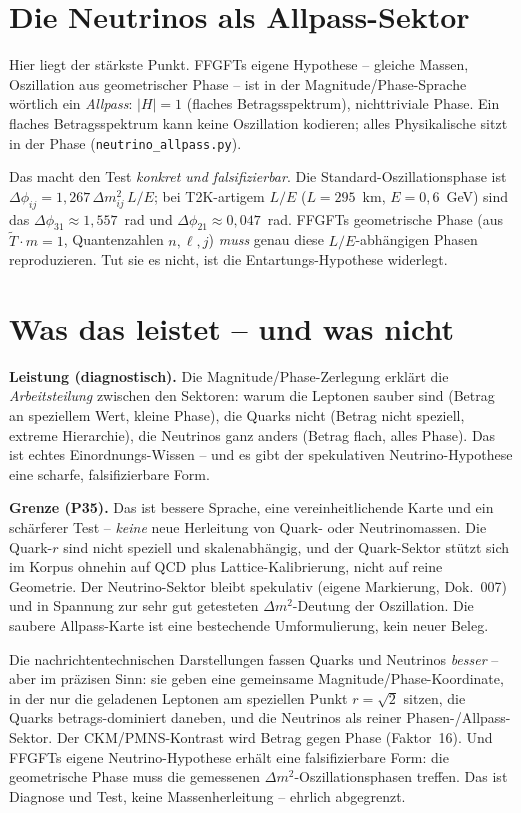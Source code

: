 \section{Die Neutrinos als Allpass-Sektor}
Hier liegt der stärkste Punkt. FFGFTs eigene Hypothese -- gleiche Massen, Oszillation aus
geometrischer Phase -- ist in der Magnitude/Phase-Sprache wörtlich ein \emph{Allpass}: $|H|=1$
(flaches Betragsspektrum), nichttriviale Phase. Ein flaches Betragsspektrum kann keine Oszillation
kodieren; alles Physikalische sitzt in der Phase (\texttt{neutrino\_allpass.py}).

Das macht den Test \emph{konkret und falsifizierbar}. Die Standard-Oszillationsphase ist
$\Delta\phi_{ij}=1{,}267\,\Delta m^2_{ij}\,L/E$; bei T2K-artigem $L/E$ ($L=295$~km, $E=0{,}6$~GeV)
sind das $\Delta\phi_{31}\approx1{,}557$~rad und $\Delta\phi_{21}\approx0{,}047$~rad. FFGFTs
geometrische Phase (aus $\tilde T\cdot m=1$, Quantenzahlen $n,\ell,j$) \emph{muss} genau diese
$L/E$-abhängigen Phasen reproduzieren. Tut sie es nicht, ist die Entartungs-Hypothese widerlegt.

\section{Was das leistet -- und was nicht}
\begin{important}
\textbf{Leistung (diagnostisch).} Die Magnitude/Phase-Zerlegung erklärt die \emph{Arbeitsteilung}
zwischen den Sektoren: warum die Leptonen sauber sind (Betrag an speziellem Wert, kleine Phase), die
Quarks nicht (Betrag nicht speziell, extreme Hierarchie), die Neutrinos ganz anders (Betrag flach,
alles Phase). Das ist echtes Einordnungs-Wissen -- und es gibt der spekulativen Neutrino-Hypothese
eine scharfe, falsifizierbare Form.

\textbf{Grenze (P35).} Das ist bessere Sprache, eine vereinheitlichende Karte und ein schärferer Test
-- \emph{keine} neue Herleitung von Quark- oder Neutrinomassen. Die Quark-$r$ sind nicht speziell und
skalenabhängig, und der Quark-Sektor stützt sich im Korpus ohnehin auf QCD plus Lattice-Kalibrierung,
nicht auf reine Geometrie. Der Neutrino-Sektor bleibt spekulativ (eigene Markierung, Dok.~007) und in
Spannung zur sehr gut getesteten $\Delta m^2$-Deutung der Oszillation. Die saubere Allpass-Karte ist
eine bestechende Umformulierung, kein neuer Beleg.
\end{important}

\begin{conclusionBox}
Die nachrichtentechnischen Darstellungen fassen Quarks und Neutrinos \emph{besser} -- aber im präzisen
Sinn: sie geben eine gemeinsame Magnitude/Phase-Koordinate, in der nur die geladenen Leptonen am
speziellen Punkt $r=\sqrt2$ sitzen, die Quarks betrags-dominiert daneben, und die Neutrinos als reiner
Phasen-/Allpass-Sektor. Der CKM/PMNS-Kontrast wird Betrag gegen Phase (Faktor~16). Und FFGFTs eigene
Neutrino-Hypothese erhält eine falsifizierbare Form: die geometrische Phase muss die gemessenen
$\Delta m^2$-Oszillationsphasen treffen. Das ist Diagnose und Test, keine Massenherleitung -- ehrlich
abgegrenzt.
\end{conclusionBox}

